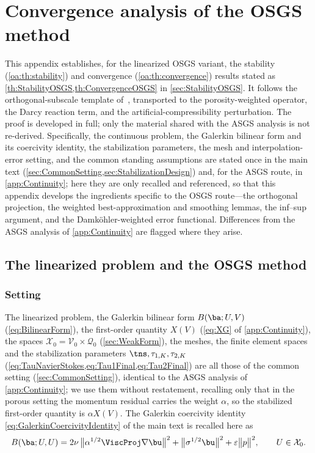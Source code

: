\section{Convergence analysis of the OSGS method}\label{app:osgs}

This appendix establishes, for the linearized OSGS variant, the stability
(\cref{oa:th:stability}) and convergence (\cref{oa:th:convergence}) results stated as
\cref{th:StabilityOSGS,th:ConvergenceOSGS} in \cref{sec:StabilityOSGS}. It follows the orthogonal-subscale template
of~\cite{codina2008analysis}, transported to the porosity-weighted operator, the Darcy
reaction term, and the artificial-compressibility perturbation. The proof is developed in
full; only the material shared with the ASGS analysis is not re-derived. Specifically, the
continuous problem, the Galerkin bilinear form and its coercivity identity, the stabilization
parameters, the mesh and interpolation-error setting, and the common standing assumptions are
stated once in the main text (\cref{sec:CommonSetting,sec:StabilizationDesign}) and, for the
ASGS route, in \cref{app:Continuity}; here they are only recalled and referenced, so that this
appendix develops the ingredients specific to the OSGS route---the orthogonal projection, the
weighted best-approximation and smoothing lemmas, the inf--sup argument, and the
Damk\"ohler-weighted error functional. Differences from the ASGS analysis of
\cref{app:Continuity} are flagged where they arise.

\subsection{The linearized problem and the OSGS method}
\label{oa:sec:setting}

\subsubsection{Setting}
\label{oa:sec:continuous}

The linearized problem, the Galerkin bilinear form $B(\ba;U,V)$ (\cref{eq:BilinearForm}), the
first{\hyp}order quantity $X(V)$ (\cref{eq:XG} of \cref{app:Continuity}), the spaces $\mathcal{X}_0 = \mathcal{V}_0\times\mathcal{Q}_0$
(\cref{sec:WeakForm}), the meshes, the finite element spaces and the stabilization parameters
$\tns, \tau_{1,K}, \tau_{2,K}$ (\cref{eq:TauNavierStokes,eq:Tau1Final,eq:Tau2Final}) are all those of the
common setting (\cref{sec:CommonSetting}), identical to the ASGS analysis of \cref{app:Continuity}; we use
them without restatement, recalling only that in the porous setting the momentum residual carries the
weight $\alpha$, so the stabilized first{\hyp}order quantity is $\alpha X(V)$. The Galerkin coercivity
identity \cref{eq:GalerkinCoercivityIdentity} of the main text is recalled here as
\begin{equation}
  \label{oa:eq:CoercivityIdentity}
  B(\ba; U, U)
  = 2\nu\,\bigl\lVert \alpha^{1/2}\ViscProj\nabla\bu \bigr\rVert^2
  + \bigl\lVert\sigma^{1/2}\bu\bigr\rVert^2
  + \varepsilon\bigl\lVert p\bigr\rVert^2 ,
  \qquad U \in \mathcal{X}_0 .
\end{equation}

